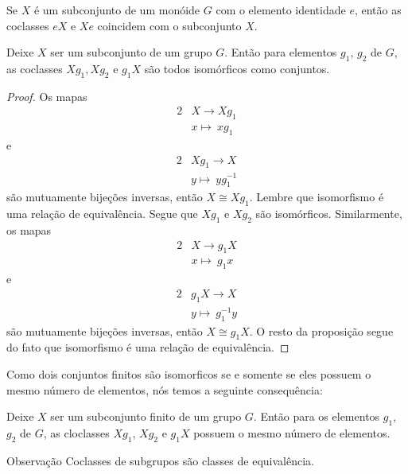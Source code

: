 Se $X$ é um subconjunto de um monóide $G$ com o elemento identidade $e$, então as coclasses $eX$ e $Xe$ coincidem com o subconjunto $X$. 
\begin{stat}
  Deixe $X$ ser um subconjunto de um grupo $G$. Então para elementos $g_{1}$, $g_{2}$ de $G$, as coclasses $Xg_{1},Xg_{2}$ e $g_{1}X$ são todos isomórficos como conjuntos.
  \begin{proof}
    Os mapas
    \begin{alignat}{2}
      &X \to Xg_{1} \nonumber\\
      &x \mapsto\ xg_{1}
      \nonumber
    \end{alignat}
    e
    \begin{alignat}{2}
      &Xg_{1} \to X \nonumber\\
      &y \mapsto\ yg_{1}^{-1}
      \nonumber
    \end{alignat}
    são mutuamente bijeções inversas, então $X\cong Xg_{1}$. Lembre que isomorfismo é uma relação de equivalência. Segue que $Xg_{1}$ e $Xg_{2}$ são isomórficos. Similarmente, os mapas
    \begin{alignat}{2}
      &X \to g_{1}X \nonumber\\
      &x \mapsto\ g_{1}x
      \nonumber
    \end{alignat}
    e
    \begin{alignat}{2}
      &g_{1}X \to X \nonumber\\
      &y \mapsto\ g_{1}^{-1}y
      \nonumber
    \end{alignat}
    são mutuamente bijeções inversas, então $X\cong g_{1}X$. O resto da proposição segue do fato que isomorfismo é uma relação de equivalência.
  \end{proof}
\end{stat}

Como dois conjuntos finitos são isomorficos se e somente se eles possuem o mesmo número de elementos, nós temos a seguinte consequência:
\begin{corollary}
  Deixe $X$ ser um subconjunto finito de um grupo $G$. Então para os elementos $g_{1}$, $g_{2}$ de $G$, as cloclasses $Xg_{1}$, $Xg_{2}$ e $g_{1}X$ possuem o mesmo número de elementos.
\end{corollary}

\begin{mymdframed}{Observação}
  Coclasses de subgrupos são classes de equivalência.
\end{mymdframed}

